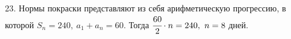 23. Нормы покраски представляют из себя арифметическую прогрессию, в которой $S_n=240,\ a_1+a_n=60.$ Тогда $\cfrac{60}{2}\cdot n=240,\ n=8$ дней.\\
